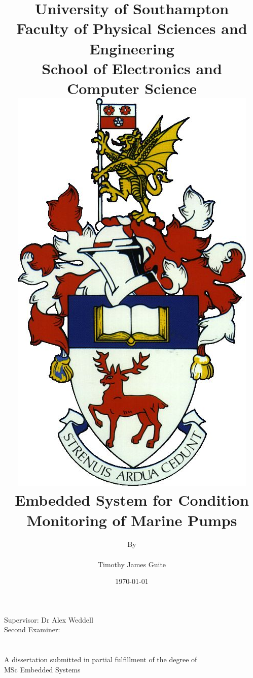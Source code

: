 \documentclass[12pt]{report}
\title{
	{\small University of Southampton}\\
	{\small Faculty of Physical Sciences and Engineering}\\
	{\small School of Electronics and Computer Science}\\
	[2cm]
	{\includegraphics{Images/coat_of_arms.jpg}}\\[2cm]
	\textbf{{Embedded System for Condition Monitoring of Marine Pumps}}
}
\author{By\\ \\
	Timothy James Guite}
\date{\today}
\begin{document}
\maketitle
\begin{center}
Supervisor: Dr Alex Weddell\\
Second Examiner:\\
\\
\\
A dissertation submitted in partial fulfillment of the degree of \\
MSc Embedded Systems
\end{center}
\end{document}
